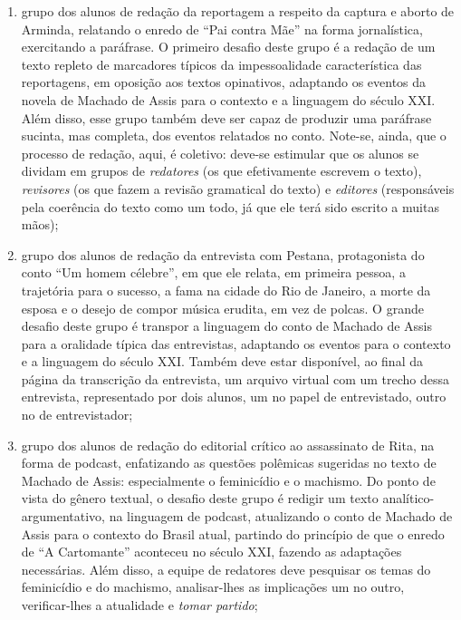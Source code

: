 \documentclass[12pt]{extarticle}
\begin{document}
\begin{enumerate}
\item grupo dos alunos de redação da reportagem a respeito da captura e
aborto de Arminda, relatando o enredo de ``Pai contra Mãe'' na forma
jornalística, exercitando a paráfrase. O primeiro desafio deste grupo é
a redação de um texto repleto de marcadores típicos da impessoalidade
característica das reportagens, em oposição aos textos opinativos,
adaptando os eventos da novela de Machado de Assis para o contexto e a
linguagem do século XXI. Além disso, esse grupo também deve ser capaz de
produzir uma paráfrase sucinta, mas completa, dos eventos relatados no
conto. Note-se, ainda, que o processo de redação, aqui, é coletivo:
deve-se estimular que os alunos se dividam em grupos de \emph{redatores}
(os que efetivamente escrevem o texto), \emph{revisores} (os que fazem a
revisão gramatical do texto) e \emph{editores} (responsáveis pela
coerência do texto como um todo, já que ele terá sido escrito a muitas
mãos);

\item grupo dos alunos de redação da entrevista com Pestana, protagonista
do conto ``Um homem célebre'', em que ele relata, em primeira pessoa, a
trajetória para o sucesso, a fama na cidade do Rio de Janeiro, a morte
da esposa e o desejo de compor música erudita, em vez de polcas. O
grande desafio deste grupo é transpor a linguagem do conto de Machado de
Assis para a oralidade típica das entrevistas, adaptando os eventos para
o contexto e a linguagem do século XXI. Também deve estar disponível, ao
final da página da transcrição da entrevista, um arquivo virtual com um
trecho dessa entrevista, representado por dois alunos, um no papel de
entrevistado, outro no de entrevistador;

\item grupo dos alunos de redação do editorial crítico ao assassinato de
Rita, na forma de podcast, enfatizando as questões polêmicas sugeridas
no texto de Machado de Assis: especialmente o feminicídio e o machismo.
Do ponto de vista do gênero textual, o desafio deste grupo é redigir um
texto analítico-argumentativo, na linguagem de podcast, atualizando o
conto de Machado de Assis para o contexto do Brasil atual, partindo do
princípio de que o enredo de ``A Cartomante'' aconteceu no século XXI,
fazendo as adaptações necessárias. Além disso, a equipe de redatores
deve pesquisar os temas do feminicídio e do machismo, analisar-lhes as
implicações um no outro, verificar-lhes a atualidade e \emph{tomar
partido};


\end{enumerate}
\end{document}
